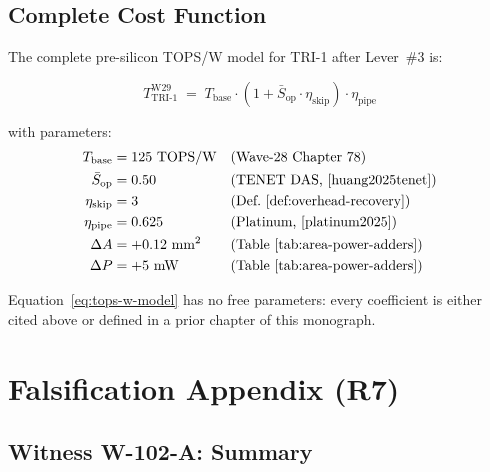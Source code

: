 \subsection{Complete Cost Function}
\label{subsec:ch79-cost-function}

The complete pre-silicon TOPS/W model for TRI-1 after Lever~\#3 is:

\begin{equation}
  T_{\mathrm{TRI\text{-}1}}^{\mathrm{W29}}
    \;=\; T_{\mathrm{base}}
      \cdot (1 + \bar{S}_{\mathrm{op}} \cdot \eta_{\mathrm{skip}})
      \cdot \eta_{\mathrm{pipe}}
  \label{eq:tops-w-model}
\end{equation}

with parameters:
\begin{align*}
  T_{\mathrm{base}}              &= 125~\text{TOPS/W} && \text{(Wave-28 Chapter~78)} \\
  \bar{S}_{\mathrm{op}}          &= 0.50              && \text{(TENET DAS, \cite{huang2025tenet})} \\
  \eta_{\mathrm{skip}}           &= 3                 && \text{(Def.~\ref{def:overhead-recovery})} \\
  \eta_{\mathrm{pipe}}           &= 0.625             && \text{(Platinum, \cite{platinum2025})} \\
  \Delta A                       &= +0.12~\text{mm}^2 && \text{(Table~\ref{tab:area-power-adders})} \\
  \Delta P                       &= +5~\text{mW}      && \text{(Table~\ref{tab:area-power-adders})}
\end{align*}

Equation~\eqref{eq:tops-w-model} has no free parameters: every
coefficient is either cited above or defined in a prior chapter
of this monograph.

\section{Falsification Appendix (R7)}
\label{sec:ch79-falsification-appendix}

\subsection{Witness W-102-A: Summary}
\label{subsec:ch79-w102a-summary}

